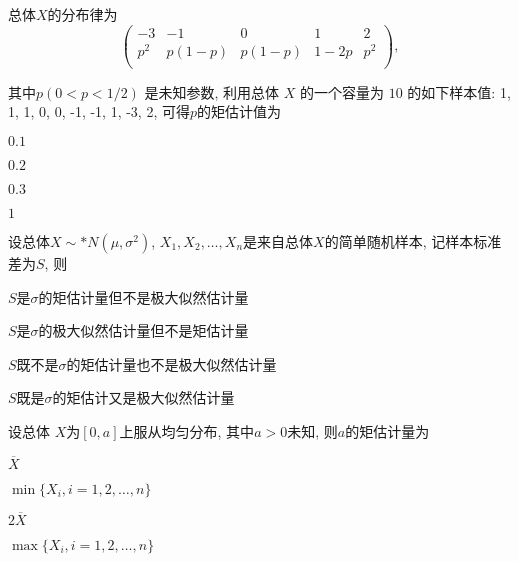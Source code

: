 \documentclass{exam-zh}
\begin{document}
\begin{question}
  总体$X$的分布律为
  $$\begin{pmatrix}
  -3 & -1 & 0 & 1 & 2 \\
  p^2 & p(1-p) & p(1-p) & 1-2p & p^2\\
  \end{pmatrix},$$

  其中$p(0<p<1/2)$ 是未知参数, 利用总体 $X$ 的一个容量为 $10$ 的如下样本值: 1, 1, 1, 0, 0, -1, -1, 1, -3, 2, 可得$p$的矩估计值为 \paren[C]
  
  \begin{choices}
      \item $0.1$
      \item $0.2$
      \item $0.3$
      \item $1$
  \end{choices}
\end{question}

\begin{question}
  设总体$X \sim* N(\mu, \sigma^2)$, $X_1, X_2,\dots, X_n$是来自总体$X$的简单随机样本, 记样本标准差为$S$, 则 \paren[C]
  
  \begin{choices}
    \item $S$是$\sigma$的矩估计量但不是极大似然估计量
    \item $S$是$\sigma$的极大似然估计量但不是矩估计量
    \item $S$既不是$\sigma$的矩估计量也不是极大似然估计量
    \item $S$既是$\sigma$的矩估计又是极大似然估计量
  \end{choices}
\end{question}

\begin{question}
  设总体 $X$为$[0, a]$上服从均匀分布, 其中$a>0$未知, 则$a$的矩估计量为 \paren[C]
  
  \begin{choices}
      \item $\overline{X}$
      \item $\min\{X_i, i=1, 2, \dots, n\}$
      \item $2\overline{X}$
      \item $\max\{X_i, i = 1, 2, \dots, n\}$
  \end{choices}
\end{question}
\end{document}
